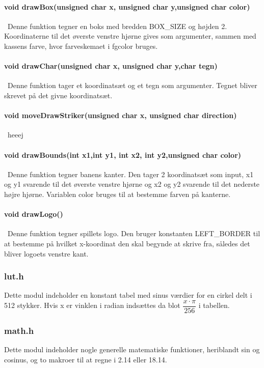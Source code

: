 \paragraph{
void drawBox(unsigned char x, unsigned char y,unsigned char color)}\
Denne funktion tegner en boks med bredden BOX\_SIZE og højden 2. Koordinaterne til det øverste venstre hjørne gives som argumenter, sammen med kassens farve, hvor farveskemaet i fgcolor bruges.

\paragraph{void drawChar(unsigned char x, unsigned char y,char tegn)}\
Denne funktion tager et koordinatsæt og et tegn som argumenter. Tegnet bliver skrevet på det givne koordinatsæt.

\paragraph{void moveDrawStriker(unsigned char x, unsigned char direction)}\
heeej

\paragraph{void drawBounds(int x1,int y1, int x2, int y2,unsigned char color)}\
Denne funktion tegner banens kanter. Den tager 2 koordinatsæt som input, x1 og y1 svarende til det øverste venstre hjørne og  x2 og y2 svarende til det nederste højre hjørne. Variablen color bruges til at bestemme farven på kanterne. 

\paragraph{void drawLogo()}\
Denne funktion tegner spillets logo. Den bruger konstanten LEFT\_BORDER til at bestemme på hvilket x-koordinat den skal begynde at skrive fra, således det bliver logoets venstre kant.
\subsubsection{lut.h}
\label{lut}
Dette modul indeholder en konstant tabel med sinus værdier for en cirkel delt i 512 stykker. Hvis x er vinklen i radian indsættes da blot $\dfrac{x\cdot \pi}{256}$ i tabellen.
\subsubsection{math.h}
Dette modul indeholder nogle generelle matematiske funktioner, heriblandt sin og cosinus, og to makroer til at regne i 2.14 eller 18.14.
